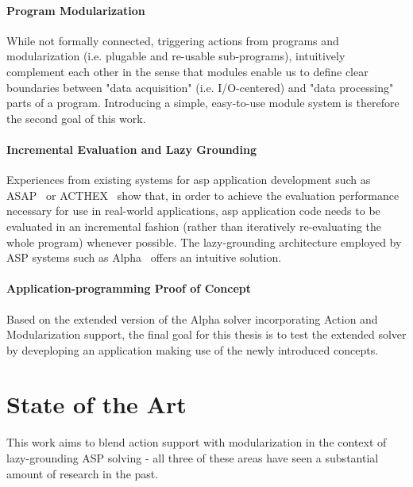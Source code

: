 \paragraph{Program Modularization} While not formally connected, triggering actions from programs and modularization (i.e. plugable and re-usable sub-programs), intuitively complement each other in the sense that modules enable us to define clear boundaries between "data acquisition" (i.e. I/O-centered) and "data processing" parts of a program. Introducing a simple, easy-to-use module system is therefore the second goal of this work.

\paragraph{Incremental Evaluation and Lazy Grounding} Experiences from existing systems for \gls{asp} application development such as ASAP~\cite{aspetris} or ACTHEX~\cite{acthex} show that, in order to achieve the evaluation performance necessary for use in real-world applications, \gls{asp} application code needs to be evaluated in an incremental fashion (rather than iteratively re-evaluating the whole program) whenever possible. The lazy-grounding architecture employed by ASP systems such as Alpha~\cite{alpha} offers an intuitive solution.

\paragraph{Application-programming Proof of Concept} Based on the extended version of the Alpha solver incorporating Action and Modularization support, the final goal for this thesis is to test the extended solver by deveploping an application making use of the newly introduced concepts.

\section{State of the Art}
\label{sec:state-of-the-art}
This work aims to blend action support with modularization in the context of lazy-grounding ASP solving - all three of these areas have seen a substantial amount of research in the past.

